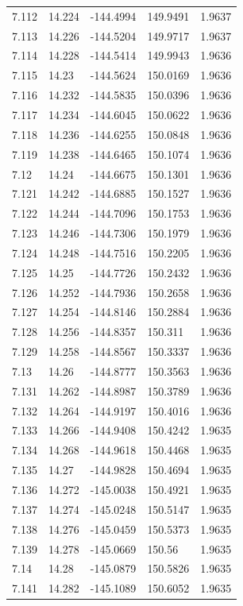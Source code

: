 \begin{tabular}{lllll}
7.112 & 14.224 & -144.4994 & 149.9491 & 1.9637 \\
7.113 & 14.226 & -144.5204 & 149.9717 & 1.9637 \\
7.114 & 14.228 & -144.5414 & 149.9943 & 1.9636 \\
7.115 & 14.23 & -144.5624 & 150.0169 & 1.9636 \\
7.116 & 14.232 & -144.5835 & 150.0396 & 1.9636 \\
7.117 & 14.234 & -144.6045 & 150.0622 & 1.9636 \\
7.118 & 14.236 & -144.6255 & 150.0848 & 1.9636 \\
7.119 & 14.238 & -144.6465 & 150.1074 & 1.9636 \\
7.12 & 14.24 & -144.6675 & 150.1301 & 1.9636 \\
7.121 & 14.242 & -144.6885 & 150.1527 & 1.9636 \\
7.122 & 14.244 & -144.7096 & 150.1753 & 1.9636 \\
7.123 & 14.246 & -144.7306 & 150.1979 & 1.9636 \\
7.124 & 14.248 & -144.7516 & 150.2205 & 1.9636 \\
7.125 & 14.25 & -144.7726 & 150.2432 & 1.9636 \\
7.126 & 14.252 & -144.7936 & 150.2658 & 1.9636 \\
7.127 & 14.254 & -144.8146 & 150.2884 & 1.9636 \\
7.128 & 14.256 & -144.8357 & 150.311 & 1.9636 \\
7.129 & 14.258 & -144.8567 & 150.3337 & 1.9636 \\
7.13 & 14.26 & -144.8777 & 150.3563 & 1.9636 \\
7.131 & 14.262 & -144.8987 & 150.3789 & 1.9636 \\
7.132 & 14.264 & -144.9197 & 150.4016 & 1.9636 \\
7.133 & 14.266 & -144.9408 & 150.4242 & 1.9635 \\
7.134 & 14.268 & -144.9618 & 150.4468 & 1.9635 \\
7.135 & 14.27 & -144.9828 & 150.4694 & 1.9635 \\
7.136 & 14.272 & -145.0038 & 150.4921 & 1.9635 \\
7.137 & 14.274 & -145.0248 & 150.5147 & 1.9635 \\
7.138 & 14.276 & -145.0459 & 150.5373 & 1.9635 \\
7.139 & 14.278 & -145.0669 & 150.56 & 1.9635 \\
7.14 & 14.28 & -145.0879 & 150.5826 & 1.9635 \\
7.141 & 14.282 & -145.1089 & 150.6052 & 1.9635 \\

\end{tabular}
